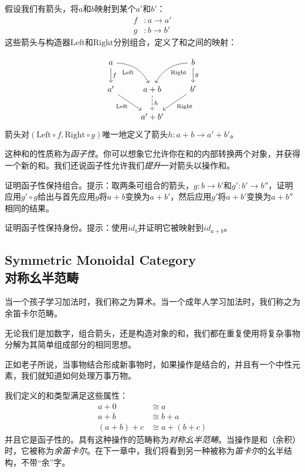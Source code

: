 \documentclass[DaoFP]{subfiles}
\begin{document}
 假设我们有箭头，将$a$和$b$映射到某个$a'$和$b'$：
 \begin{align*}f &\colon a \to a' \\
 g &\colon b \to b'
 \end{align*}
 这些箭头与构造器$\text{Left}$和$\text{Right}$分别组合，定义了和之间的映射：

 \[
  \begin{tikzcd}
   a
   \arrow[d, "f"]
   \arrow[dr,  bend left, "\text{Left}"']
   && b
   \arrow[d, "g"]
   \arrow[dl, bend right, "\text{Right}"]
   \\
   a'
   \arrow[rd, "\text{Left}"']
   &a + b
   \arrow[d, dashed, "h"]
   & b'
   \arrow[ld, "\text{Right}"]
   \\
   & a' + b'
  \end{tikzcd}
 \]
 箭头对$(\text{Left} \circ f, \text{Right} \circ g)$唯一地定义了箭头$h \colon a + b \to a' + b'$。

 这种和的性质称为\emph{函子性}。你可以想象它允许你在和的内部转换两个对象，并获得一个新的和。我们还说函子性允许我们\emph{提升}一对箭头以操作和。

 \begin{exercise}
  证明函子性保持组合。提示：取两条可组合的箭头，$g \colon b \to b'$和$g' \colon b' \to b''$，证明应用$g' \circ g$给出与首先应用$g$将$a + b$变换为$a + b'$，然后应用$g'$将$a + b'$变换为$a + b''$相同的结果。
 \end{exercise}

 \begin{exercise}
  证明函子性保持身份。提示：使用$id_b$并证明它被映射到$id_{a+b}$。
 \end{exercise}

 \subsection{Symmetric Monoidal Category\\对称幺半范畴}

 当一个孩子学习加法时，我们称之为算术。当一个成年人学习加法时，我们称之为余笛卡尔范畴。

 无论我们是加数字，组合箭头，还是构造对象的和，我们都在重复使用将复杂事物分解为其简单组成部分的相同思想。

 正如老子所说，当事物结合形成新事物时，如果操作是结合的，并且有一个中性元素，我们就知道如何处理万事万物。

 我们定义的和类型满足这些属性：
 \begin{align*}
  a + 0 &\cong a \\
  a + b &\cong b + a \\
  (a + b) + c &\cong a + (b + c)
 \end{align*}
 并且它是函子性的。具有这种操作的范畴称为\emph{对称幺半范畴}。当操作是和（余积）时，它被称为\emph{余笛卡尔}。在下一章中，我们将看到另一种被称为\emph{笛卡尔}的幺半结构，不带“余”字。
\end{document}
